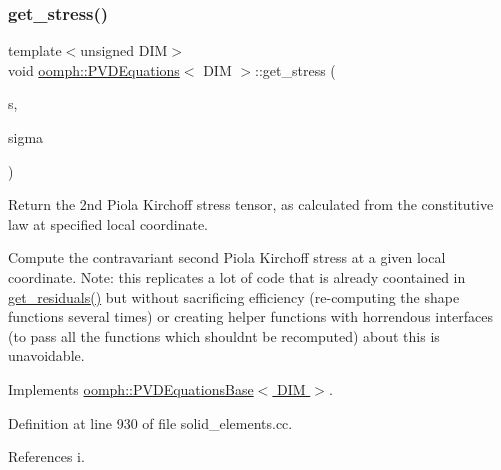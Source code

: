 \subsubsection{\texorpdfstring{get\+\_\+stress()}{get\_stress()}\hspace{0.1cm}{\footnotesize\ttfamily [1/2]}}
{\footnotesize\ttfamily template$<$unsigned D\+IM$>$ \\
void \hyperlink{classoomph_1_1PVDEquations}{oomph\+::\+P\+V\+D\+Equations}$<$ D\+IM $>$\+::get\+\_\+stress (\begin{DoxyParamCaption}\item[{const \hyperlink{classoomph_1_1Vector}{Vector}$<$ double $>$ \&}]{s,  }\item[{\hyperlink{classoomph_1_1DenseMatrix}{Dense\+Matrix}$<$ double $>$ \&}]{sigma }\end{DoxyParamCaption})\hspace{0.3cm}{\ttfamily [virtual]}}



Return the 2nd Piola Kirchoff stress tensor, as calculated from the constitutive law at specified local coordinate. 

Compute the contravariant second Piola Kirchoff stress at a given local coordinate. Note\+: this replicates a lot of code that is already coontained in \hyperlink{classoomph_1_1GeneralisedElement_a53d348ab71c86b53619129a1dd411d30}{get\+\_\+residuals()} but without sacrificing efficiency (re-\/computing the shape functions several times) or creating helper functions with horrendous interfaces (to pass all the functions which shouldn\textquotesingle{}t be recomputed) about this is unavoidable. 

Implements \hyperlink{classoomph_1_1PVDEquationsBase_ad429d68f0129d5f7a38705aab386daa5}{oomph\+::\+P\+V\+D\+Equations\+Base$<$ D\+I\+M $>$}.



Definition at line 930 of file solid\+\_\+elements.\+cc.



References i.

\mbox{\label{classoomph_1_1PVDEquations_ae870a58617c8a268a30779e93fb96f54}} 
